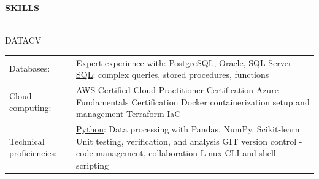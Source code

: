 \documentclass[letterpaper]{article}
\newcommand{\lineunder} {
        \vspace*{-8pt} \\
        \hspace*{-18pt} \hrulefill \\
    }
\newcommand{\header} [1] {
        \vspace{9pt}
        {\hspace*{-18pt}\vspace*{6pt} \large \textbf {#1}}
        \vspace*{-6pt} \lineunder
        \vspace{2pt}
    }
\newenvironment{skillslist}
        {
            \hspace*{-0.07in}\begin{tabular}[t]{ l L{5.17in} }
        }{
            \end{tabular}
        }
\newcommand{\impt}[1]{\uline{#1}}
\begin{document}
\header{SKILLS}
    \begin{taggedblock}{DATACV}
        \begin{skillslist}
            Databases:&
                Expert experience with: PostgreSQL, Oracle, SQL Server \linebreak
                \impt{SQL}: complex queries, stored procedures, functions \linebreak
                \\
            Cloud computing:&
                AWS Certified Cloud Practitioner Certification \linebreak
                Azure Fundamentals Certification \linebreak
                Docker containerization setup and management \linebreak
                Terraform IaC \linebreak
                \\
            Technical proficiencies:&
                \impt{Python}: Data processing with Pandas, NumPy, Scikit-learn \linebreak
                Unit testing, verification, and analysis\linebreak
                GIT version control - code management, collaboration \linebreak
                Linux CLI and shell scripting \linebreak
                \\
        \end{skillslist}
    \end{taggedblock}
\end{document}
